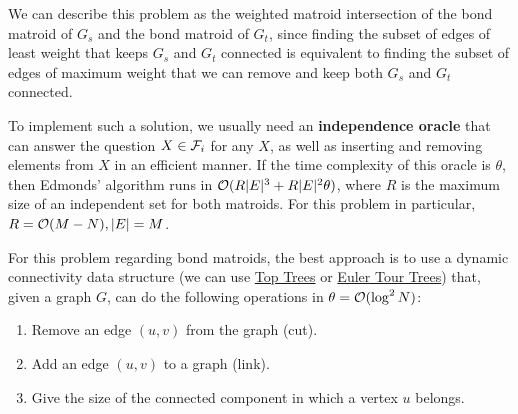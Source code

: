 \documentclass[english,12pt]{article}
\begin{document}
        We can describe this problem as the weighted matroid intersection of the bond matroid of $G_s$ and the bond matroid of $G_t$, since finding the subset of edges of least weight that keeps $G_s$ and $G_t$ connected is equivalent to finding the subset of edges of maximum weight that we can remove and keep both $G_s$ and $G_t$ connected.

        To implement such a solution, we usually need an \textbf{independence oracle} that can answer the question $X \in \mathcal{F}_i$ for any $X$, as well as inserting and removing elements from $X$ in an efficient manner.
        If the time complexity of this oracle is $\theta$, then Edmonds' algorithm runs in $\mathcal{O}(R|E|^3 + R|E|^2\theta)$, where $R$ is the maximum size of an independent set for both matroids.
        For this problem in particular, $R = \mathcal{O}(M - N), |E| = M$.

        For this problem regarding bond matroids, the best approach is to use a dynamic connectivity data structure (we can use \href{https://codeforces.com/blog/entry/128556}{Top Trees} or \href{https://courses.csail.mit.edu/6.851/spring12/scribe/L20.pdf}{Euler Tour Trees}) that, given a graph $G$, can do the following operations in $\theta = \mathcal{O}(\log^2 N)$:
        \begin{enumerate}
            \item Remove an edge $(u, v)$ from the graph (cut).
            \item Add an edge $(u, v)$ to a graph (link).
            \item Give the size of the connected component in which a vertex $u$ belongs.
        \end{enumerate}
\end{document}
